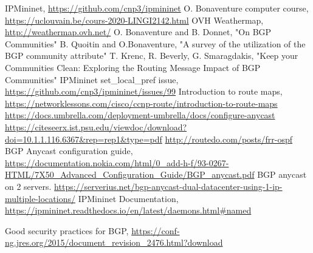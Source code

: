 \documentclass[letter, 9pt, conference]{ieeeconf}
\begin{document}
\addtolength{\textheight}{-10cm}   %







\begin{thebibliography}{99}

 IPMininet, \url{https://github.com/cnp3/ipmininet}
 O. Bonaventure computer course,  \url{https://uclouvain.be/cours-2020-LINGI2142.html}
 OVH Weathermap, \url{http://weathermap.ovh.net/}
 O. Bonaventure and B. Donnet, "On BGP Communities" 
 B. Quoitin and O.Bonaventure, "A survey of the utilization of the BGP community attribute" 
 T. Krenc, R. Beverly, G. Smaragdakis, "Keep your Communities Clean: Exploring the Routing Message Impact of BGP Communities" 
 IPMininet set\_local\_pref issue,  \url{https://github.com/cnp3/ipmininet/issues/99}
 Introduction to route maps,  \url{https://networklessons.com/cisco/ccnp-route/introduction-to-route-maps}
 \url{https://docs.umbrella.com/deployment-umbrella/docs/configure-anycast}
 \url{https://citeseerx.ist.psu.edu/viewdoc/download?doi=10.1.1.116.6367&rep=rep1&type=pdf}
 \url{http://routedo.com/posts/frr-ospf}
 BGP Anycast configuration guide, \url{https://documentation.nokia.com/html/0\_add-h-f/93-0267-HTML/7X50\_Advanced\_Configuration\_Guide/BGP\_anycast.pdf}
 BGP anycast on 2 servers. \url{https://serverius.net/bgp-anycast-dual-datacenter-using-1-ip-multiple-locations/}
 IPMininet Documentation, \url{https://ipmininet.readthedocs.io/en/latest/daemons.html#named}

 Good security practices for BGP,  \url{https://conf-ng.jres.org/2015/document_revision_2476.html?download}
\label{src_sec}

\end{thebibliography}
\end{document}

